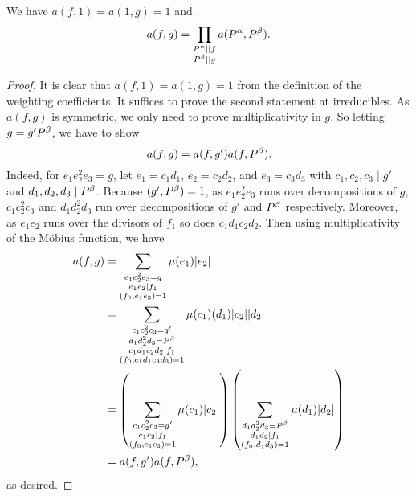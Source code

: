 \documentclass[12pt,reqno,oneside]{amsart}
\begin{document}
    \begin{proposition}\label{prop:multiplicativity_of_weighting_coefficients}
        We have $a(f,1) = a(1,g) = 1$ and
        \[
            a(f,g) = \prod_{\substack{P^{\alpha} \mid\mid f \\ P^{\beta} \mid\mid g}}a(P^{\alpha},P^{\beta}).
        \]
    \end{proposition}
    \begin{proof}
        It is clear that $a(f,1) = a(1,g) = 1$ from the definition of the weighting coefficients. It suffices to prove the second statement at irreducibles. As $a(f,g)$ is symmetric, we only need to prove multiplicativity in $g$. So letting $g = g'P^{\beta}$, we have to show
        \[
            a(f,g) = a(f,g')a(f,P^{\beta}).
        \]
        Indeed, for $e_{1}e_{2}^{2}e_{3} = g$, let $e_{1} = c_{1}d_{1}$, $e_{2} = c_{2}d_{2}$, and $e_{3} = c_{3}d_{3}$ with $c_{1},c_{2},c_{3} \mid g'$ and $d_{1},d_{2},d_{3} \mid P^{\beta}$. Because $(g',P^{\beta}) = 1$, as $e_{1}e_{2}^{2}e_{3}$ runs over decompositions of $g$, $c_{1}c_{2}^{2}c_{3}$ and $d_{1}d_{2}^{2}d_{3}$ run over decompositions of $g'$ and $P^{\beta}$ respectively. Moreover, as $e_{1}e_{2}$ runs over the divisors of $f_{1}$ so does $c_{1}d_{1}c_{2}d_{2}$. Then using multiplicativity of the M\"obius function, we have
        \begin{align*}
            a(f,g) &= \sum_{\substack{e_{1}e_{2}^{2}e_{3} =  g \\ e_{1}e_{2} \mid f_{1} \\ (f_{0},e_{1}e_{3}) = 1}}\mu(e_{1})|e_{2}| \\
            &= \sum_{\substack{c_{1}c_{2}^{2}c_{3} = g' \\ d_{1}d_{2}^{2}d_{3} = P^{\beta} \\ c_{1}d_{1}c_{2}d_{2} \mid f_{1} \\ (f_{0},c_{1}d_{1}c_{3}d_{3}) = 1}}\mu(c_{1})(d_{1})|c_{2}||d_{2}| \\
            &= \left(\sum_{\substack{c_{1}c_{2}^{2}c_{3} = g' \\ c_{1}c_{2} \mid f_{1} \\ (f_{0},c_{1}c_{3}) = 1}}\mu(c_{1})|c_{2}|\right)\left(\sum_{\substack{d_{1}d_{2}^{2}d_{3} = P^{\beta} \\ d_{1}d_{2} \mid f_{1} \\ (f_{0},d_{1}d_{3}) = 1}}\mu(d_{1})|d_{2}|\right) \\
            &= a(f,g')a(f,P^{\beta}),
        \end{align*}
        as desired.
    \end{proof}
\end{document}
